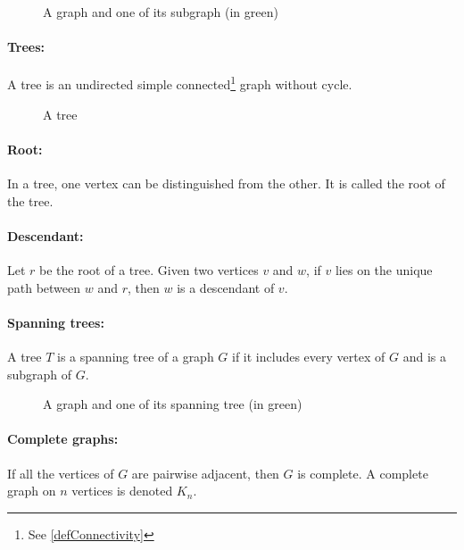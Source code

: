 \begin{figure}[!h]
  \caption{A graph and one of its subgraph (in green)}
  \begin{center}
    
  \end{center}
\end{figure}

\paragraph{Trees:}
A tree is an undirected simple connected\footnote{See \ref{defConnectivity}}
graph without cycle.

\begin{figure}[!h]
  \caption{A tree}
  \begin{center}
    
  \end{center}
\end{figure}

\paragraph{Root:}
In a tree, one vertex can be distinguished from the other. It is called the root
of the tree.

\paragraph{Descendant:}
Let $r$ be the root of a tree.
Given two vertices $v$ and $w$, if $v$ lies on the unique path between $w$ and 
$r$, then $w$ is a descendant of $v$.

\paragraph{Spanning trees:}
A tree $T$ is a spanning tree of a graph $G$ if it includes every vertex of $G$ 
and is a subgraph of $G$.

\begin{figure}[!h]
  \caption{A graph and one of its spanning tree (in green)}
  \begin{center}
    
  \end{center}
\end{figure}

\paragraph{Complete graphs:}
If all the vertices of $G$ are pairwise adjacent, then $G$ is complete. A
complete graph on $n$ vertices is denoted $K_n$.

